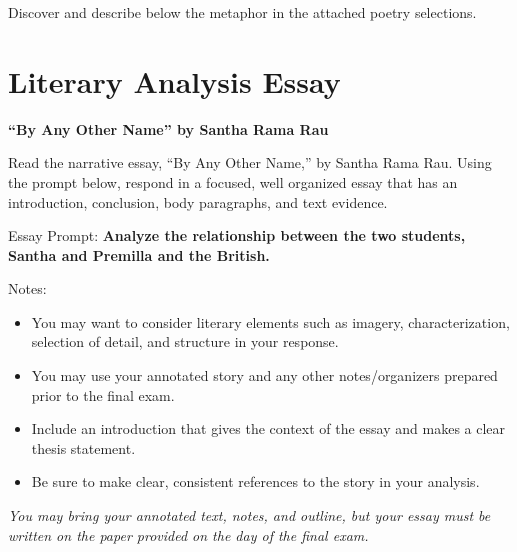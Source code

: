 \documentclass[11pt]{article}
\begin{document}
Discover and describe below the metaphor in the attached poetry selections.

\newpage

\section{Literary Analysis Essay}
\label{sec:orgc3bb5ec}
\textbf{``By Any Other Name'' by Santha Rama Rau}

Read the narrative essay, ``By Any Other Name,'' by Santha Rama
Rau. Using the prompt below, respond in a focused, well organized
essay that has an introduction, conclusion, body paragraphs, and text
evidence.
\vspace{1em}

Essay Prompt: \textbf{Analyze the relationship between the two
  students, Santha and Premilla and the British.}
\vspace{1em}

Notes:
\begin{itemize}
\item You may want to consider literary elements such as imagery,
characterization, selection of detail, and structure in your
response.
\item You may use your annotated story and any other notes/organizers
prepared prior to the final exam.
\item Include an introduction that gives the context of the essay and
makes a clear thesis statement.
\item Be sure to make clear, consistent references to the story in
your analysis.
\end{itemize}

\emph{You may bring your annotated text, notes, and outline, but your
  essay must be written on the paper provided on the day of the final
  exam.}
\end{document}
